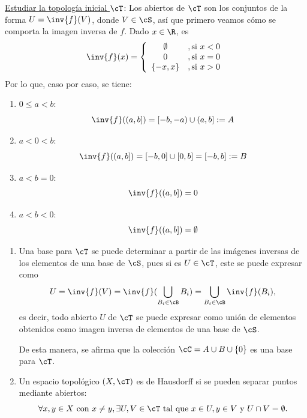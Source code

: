 \begin{solucion}
    \underline{Estudiar la topología inicial $\cT$}: 
    Los abiertos de $\cT$ son los conjuntos de la forma $U = \inv{f}(V)$, donde $V \in \cS$, así que primero veamos cómo se comporta la imagen inversa de $f$. Dado $x \in \R$, es
    \[
        \inv{f}(x) = \left\{
        \begin{array}{cl}
            \emptyset  &, \text{si } x < 0 \\
            0          &, \text{si } x = 0 \\
            \{-x, x\}  &, \text{si } x > 0
        \end{array}
        \right.
    \]
    Por lo que, caso por caso, se tiene:
    \begin{enumerate}[label={}]
        \item \underline{$0 \leq a < b$}:
        \[
            \inv{f}((a,b]) = [-b,-a) \cup (a, b] := A
        \]
        \item \underline{$a < 0 < b$}:
        \[
            \inv{f}((a,b]) = [-b,0] \cup [0, b] = [-b, b] := B
        \]
        \item \underline{$a < b = 0$}:
        \[
            \inv{f}((a,b]) = 0
        \]
        \item \underline{$a < b < 0$}:
        \[
            \inv{f}((a,b]) = \emptyset
        \]
    \end{enumerate}
    
    \begin{enumerate}[label=\alph*)]
        \item Una base para $\cT$ se puede determinar a partir de las imágenes inversas de los elementos de una base de $\cS$, pues si es $U \in \cT$, este se puede expresar como 
        \[
            U = \inv{f}(V) = \inv{f}(\bigcup\limits_{B_i\in \cB} B_i) = \bigcup\limits_{B_i\in \cB} \inv{f}(B_i),
        \]
        es decir, todo abierto $U$ de $\cT$ se puede expresar como unión de elementos obtenidos como imagen inversa de elementos de una base de $\cS$.

        De esta manera, se afirma que la colección $\cC = A \cup B \cup \{0\}$ es una base para $\cT$.

        \item Un espacio topológico $(X,\cT)$ es de Hausdorff si se pueden separar puntos mediante abiertos:
        \[
        \forall x,y\in X \text{ con } x \neq y, \exists U,V \in \cT \text{ tal que } x \in U, y \in V \text{ y } U \cap V = \emptyset.
        \]


\end{enumerate}
\end{solucion}
